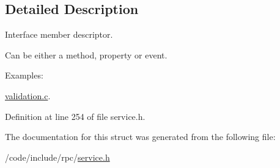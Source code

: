 \subsection{Detailed Description}
Interface member descriptor.

Can be either a method, property or event. \begin{Desc}
\item[Examples\+: ]\par
\hyperlink{validation_8c-example}{validation.\+c}.\end{Desc}


Definition at line 254 of file service.\+h.



The documentation for this struct was generated from the following file\+:\begin{DoxyCompactItemize}
\item 
/code/include/rpc/\hyperlink{service_8h}{service.\+h}\end{DoxyCompactItemize}
